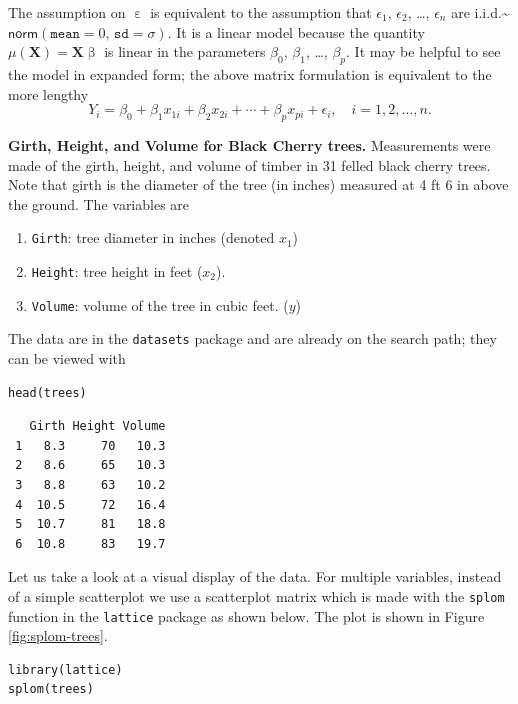 \documentclass[captions=tableheading]{scrbook}
\begin{document}
The assumption on $\upepsilon$ is equivalent to the assumption that $\epsilon_{1}$, $\epsilon_{2}$, \ldots{}, $\epsilon_{n}$ are i.i.d.\~{}$\mathsf{norm}(\mathtt{mean}=0,\,\mathtt{sd}=\sigma)$. It is a linear model because the quantity $\mu(\mathbf{X})=\mathbf{X}\upbeta$ is linear in the parameters $\beta_{0}$, $\beta_{1}$, \ldots{}, $\beta_{p}$. It may be helpful to see the model in expanded form; the above matrix formulation is equivalent to the more lengthy
\begin{equation} 
Y_{i}=\beta_{0}+\beta_{1}x_{1i}+\beta_{2}x_{2i}+\cdots+\beta_{p}x_{pi}+\epsilon_{i},\quad i=1,2,\ldots,n.
\end{equation}

\begin{example}
\textbf{Girth, Height, and Volume for Black Cherry trees.} 
Measurements were made of the girth, height, and volume of timber in 31 felled black cherry trees. Note that girth is the diameter of the tree (in inches) measured at 4 ft 6 in above the ground. The variables are

\begin{enumerate}
\item \texttt{Girth}: tree diameter in inches (denoted $x_{1}$)
\item \texttt{Height}: tree height in feet ($x_{2}$).
\item \texttt{Volume}: volume of the tree in cubic feet. ($y$)
\end{enumerate}

The data are in the \texttt{datasets} package and are already on the search path; they can be viewed with


\begin{verbatim}
head(trees)
\end{verbatim}

\begin{verbatim}
   Girth Height Volume
 1   8.3     70   10.3
 2   8.6     65   10.3
 3   8.8     63   10.2
 4  10.5     72   16.4
 5  10.7     81   18.8
 6  10.8     83   19.7
\end{verbatim}

Let us take a look at a visual display of the data. For multiple variables, instead of a simple scatterplot we use a scatterplot matrix which is made with the \texttt{splom} function in the \texttt{lattice} package \cite{Sarkarlattice} as shown below. The plot is shown in Figure \ref{fig:splom-trees}.


\begin{verbatim}
library(lattice)
splom(trees)
\end{verbatim}




\end{example}
\end{document}
